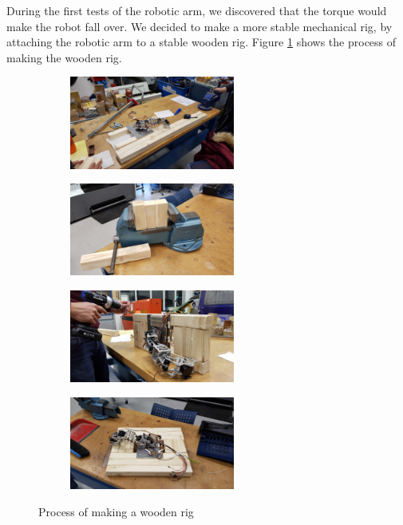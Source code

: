 \documentclass[11pt,a4paper]{report}
\begin{document}
	During the first tests of the robotic arm, we discovered that the torque would make the robot fall over. We decided to make a more stable mechanical rig, by attaching the robotic arm to a stable wooden rig. Figure \ref{fig:plank-rig} shows the process of making the wooden rig.
	
	\begin{figure}
	\centering
	
	
	\begin{subfigure}[t]{0.2\textwidth}
		
		\includegraphics[height=1.2in]{../Diagrams/plank1.jpg}
		
		
	\end{subfigure}%
	
	\begin{subfigure}[t]{0.2\textwidth}
		\centering
		\includegraphics[height=1.2in]{../Diagrams/plank2.jpg}
		
	\end{subfigure}%
	
	\begin{subfigure}[t]{0.2\textwidth}
		\includegraphics[height=1.2in]{../Diagrams/plank3.jpg}
		
	\end{subfigure}
	
	\begin{subfigure}[t]{0.2\textwidth}
		\includegraphics[height=1.2in]{../Diagrams/plank4.jpg}
		
	\end{subfigure}
	\caption{Process of making a wooden rig}
	\label{fig:plank-rig}	
	\end{figure}
	
\end{document}
